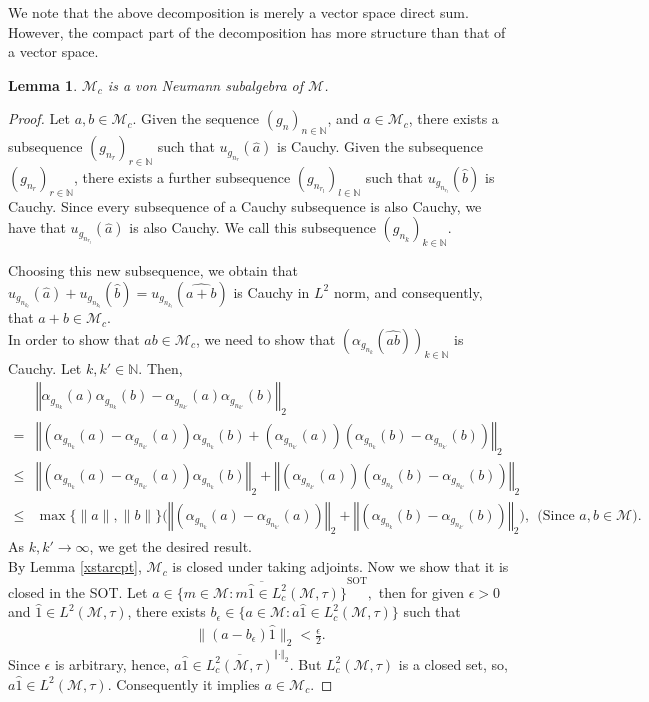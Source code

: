 \documentclass[11pt]{amsart}
\newtheorem{lem}[thm]{Lemma}
\theoremstyle{definition}
\theoremstyle{myremark}
\numberwithin{equation}{section}
\newcommand{\CM}{\mathcal{M}}
\newcommand{\norm}[1]{\left\Vert#1\right\Vert}
\begin{document}
\noindent We note that the above decomposition is merely a vector space direct sum. However, the compact part of the decomposition has more structure than that of a vector space.
\begin{lem}
$\CM_{c}$ is a von Neumann subalgebra of $\CM$.
\end{lem}
\begin{proof}
Let $a,b \in \CM_{c}$.
Given the sequence $(g_{n})_{n\in \mathbb{N}}$, and $a \in \CM_c$, there exists a  subsequence $(g_{n_{r}})_{r \in \mathbb{N}}$ such that $u_{g_{n_r}}(\widehat{a})$ is Cauchy. Given the subsequence $(g_{n_{r}})_{r \in \mathbb{N}}$, there exists a further subsequence $(g_{n_{r_{l}}})_{l \in \mathbb{N}}$ such that $u_{g_{n_{r_{l}}}}(\widehat{b})$ is Cauchy. Since every subsequence of a Cauchy subsequence is also Cauchy, we have that $u_{g_{n_{r_{l}}}}(\widehat{a})$ is also Cauchy. We call this subsequence $(g_{n_{k}})_{k \in \mathbb{N}}$.

\noindent Choosing this new subsequence, we obtain that $u_{g_{n_{k_{l}}}}(\widehat{a})+u_{g_{n_{k_{l}}}}(\widehat{b})=u_{g_{n_{k_{l}}}}(\widehat{a+b})$ is Cauchy in $L^{2}$ norm, and consequently, that $a+b \in \CM_{c}$. \\
In order to show that $ab \in \CM_{c}$, we need to show that $(\alpha_{g_{n_{k}}}(\widehat{ab}))_{k \in \mathbb{N}}$ is Cauchy. Let $k,k' \in \mathbb{N}$. Then,
\begin{align*}
 &\norm{\alpha_{g_{n_{k}}}(a)\alpha_{g_{n_{k}}}(b)-\alpha_{g_{n_{k'}}}(a)\alpha_{g_{n_{k'}}}(b)}_2\\=&\norm{(\alpha_{g_{n_{k}}}(a)-\alpha_{g_{n_{k'}}}(a))\alpha_{g_{n_{k}}}(b) +(\alpha_{g_{n_{k'}}}(a))(\alpha_{g_{n_{k}}}(b)-\alpha_{g_{n_{k'}}}(b))}_2  \\
 \leq&\norm{(\alpha_{g_{n_{k}}}(a)-\alpha_{g_{n_{k'}}}(a))\alpha_{g_{n_{k}}}(b)}_{2} +\norm{(\alpha_{g_{n_{k'}}}(a))(\alpha_{g_{n_{k}}}(b)-\alpha_{g_{n_{k'}}}(b))}_2\\
  \leq &\max\{{\|a\|,\|b\|\}} \bigl(\norm{(\alpha_{g_{n_{k}}}(a)-\alpha_{g_{n_{k'}}}(a))}_2 + \norm{(\alpha_{g_{n_{k}}}(b)-\alpha_{g_{n_{k'}}}(b))}_{2}\bigr), ~~\text{(Since $a,b \in \CM)$}.
\end{align*}
As $k,k' \rightarrow \infty$, we get the desired result.\\
By Lemma \ref{xstarcpt}, $\CM_c$ is closed under taking adjoints.
Now we show that it is closed in the SOT. Let $a \in \overline{\{m \in \CM:m\widehat{1}\in L_{c}^{2}(\mathcal{M},\tau)\}}^{\text{SOT}},$ then for  given $\epsilon > 0$ and $\widehat{1} \in L^{2}(\CM, \tau)$, there exists $b_\epsilon \in \{a \in \CM:a\widehat{1} \in L_{c}^{2}(\CM,\tau)\}$ such that
\begin{align*}
\|(a-b_\epsilon) \widehat{1}\|_{2}<\frac{\epsilon}{2}.
\end{align*}
Since $ \epsilon$ is arbitrary, hence, $ a\widehat{1} \in \overline{ L_c^2(\CM, \tau)}^{ \norm{\cdot}_2}.$ But  $ L_c^2(\CM, \tau)$ is a closed set, so, $  a\widehat{1}  \in L^2(\CM, \tau)$. Consequently it implies $ a \in \CM_c$.
\end{proof}
\end{document}
